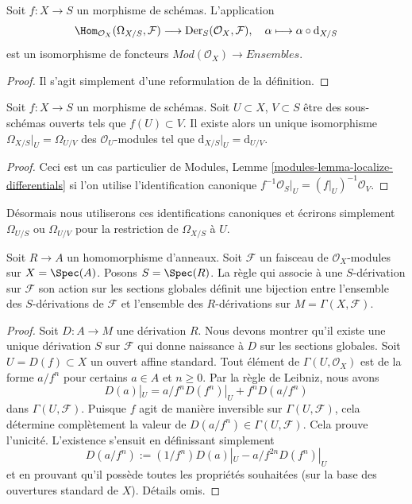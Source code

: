 \begin{lemma}
\label{lemma-universal-derivation-universal}
Soit $f : X \to S$ un morphisme de schémas. L'application
$$
\Hom_{\mathcal{O}_X}(\Omega_{X/S}, \mathcal{F})
\longrightarrow
\text{Der}_S(\mathcal{O}_X, \mathcal{F}),\quad
\alpha \longmapsto \alpha \circ \text{d}_{X/S}
$$
est un isomorphisme de foncteurs $\textit{Mod}(\mathcal{O}_X) \to \textit{Ensembles}$.
\end{lemma}

\begin{proof}
Il s'agit simplement d'une reformulation de la définition.
\end{proof}

\begin{lemma}
\label{lemma-differentials-restrict-open}
Soit $f : X \to S$ un morphisme de schémas.
Soit $U \subset X$, $V \subset S$ être des sous-schémas
ouverts tels que $f(U) \subset V$. Il existe
alors un unique isomorphisme $\Omega_{X/S}|_U = \Omega_{U/V}$ des $\mathcal{O}_U$-modules
tel que $\text{d}_{X/S}|_U = \text{d}_{U/V}$.
\end{lemma}

\begin{proof}
Ceci est un cas particulier
de Modules, Lemme \ref{modules-lemma-localize-differentials}
si l'on utilise l'identification
canonique $f^{-1}\mathcal{O}_S|_U = (f|_U)^{-1}\mathcal{O}_V$.
\end{proof}

\noindent
Désormais nous utiliserons ces identifications canoniques et écrirons
simplement $\Omega_{U/S}$ ou $\Omega_{U/V}$ pour la restriction de $\Omega_{X/S}$
à $U$.

\begin{lemma}
\label{lemma-affine-case-derivation}
Soit $R \to A$ un homomorphisme d'anneaux. Soit
$\mathcal{F}$ un faisceau de $\mathcal{O}_X$-modules
sur $X = \Spec(A)$. Posons $S = \Spec(R)$.
La règle qui associe à une $S$-dérivation sur $\mathcal{F}$ son
action sur les sections globales définit une bijection entre
l'ensemble des $S$-dérivations de $\mathcal{F}$ et l'ensemble
des $R$-dérivations sur $M = \Gamma(X, \mathcal{F})$.
\end{lemma}

\begin{proof}
Soit $D : A \to M$ une dérivation $R$. Nous devons montrer qu'il existe
une unique dérivation $S$ sur $\mathcal{F}$ qui donne naissance
à $D$ sur les sections globales. Soit $U = D(f) \subset X$ un ouvert affine standard.
Tout élément de $\Gamma(U, \mathcal{O}_X)$ est de la forme $a/f^n$ pour
certains $a \in A$ et $n \geq 0$. Par la règle de Leibniz, nous
avons
$$
D(a)|_U = a/f^n D(f^n)|_U + f^n D(a/f^n)
$$
dans $\Gamma(U, \mathcal{F})$. Puisque $f$ agit de manière
inversible sur $\Gamma(U, \mathcal{F})$, cela détermine complètement
la valeur de $D(a/f^n) \in \Gamma(U, \mathcal{F})$. Cela prouve l’unicité.
L'existence s'ensuit en définissant simplement
$$
D(a/f^n) := (1/f^n) D(a)|_U - a/f^{2n} D(f^n)|_U
$$
et en prouvant qu'il possède toutes les propriétés souhaitées (sur la base des
ouvertures standard de $X$). Détails omis.
\end{proof}

